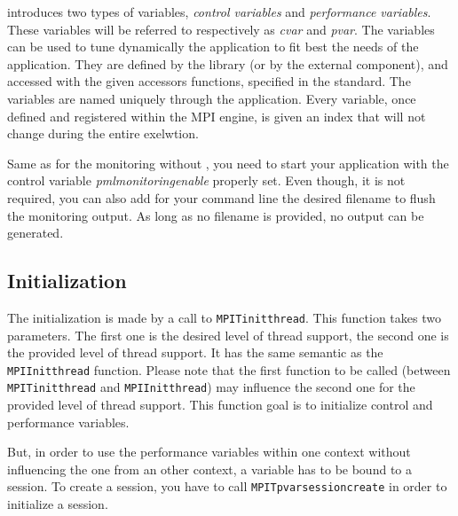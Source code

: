 \mpit{} introduces two types of variables, \textit{control variables}
and \textit{performance variables}. These variables will be referred
to respectively as \textit{cvar} and \textit{pvar}. The variables can
be used to tune dynamically the application to fit best the needs of
the application. They are defined by the library (or by the external
component), and accessed with the given accessors functions, specified
in the standard. The variables are named uniquely through the
application. Every variable, once defined and registered within the
MPI engine, is given an index that will not change during the entire
exelwtion.

Same as for the monitoring without \mpit{}, you need to start your
application with the control variable
\textit{pml\brkunds{}monitoring\brkunds{}enable} properly set. Even
though, it is not required, you can also add for your command line the
desired filename to flush the monitoring output. As long as no
filename is provided, no output can be generated.

\subsection{Initialization}

The initialization is made by a call to
\texttt{MPI\brkunds{}T\brkunds{}init\brkunds{}thread}.  This function
takes two parameters. The first one is the desired level of thread
support, the second one is the provided level of thread support. It
has the same semantic as the
\texttt{MPI\brkunds{}Init\brkunds{}thread} function. Please note that
the first function to be called (between
\texttt{MPI\brkunds{}T\brkunds{}init\brkunds{}thread} and
\texttt{MPI\brkunds{}Init\brkunds{}thread}) may influence the second
one for the provided level of thread support. This function goal is to
initialize control and performance variables.

But, in order to use the performance variables within one context
without influencing the one from an other context, a variable has to
be bound to a session. To create a session, you have to call
\texttt{MPI\brkunds{}T\brkunds{}pvar\brkunds{}session\brkunds{}create}
in order to initialize a session.

